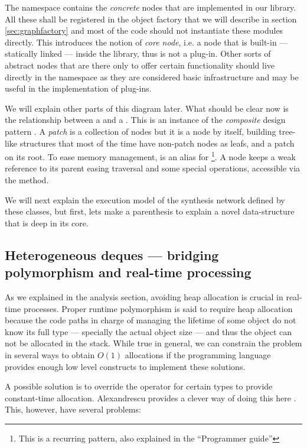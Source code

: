 The  namespace contains the \emph{concrete}
nodes that are implemented in our library. All these shall be
registered in the object factory that we will describe in section
\ref{sec:graphfactory} and most of the code should not instantiate
these modules directly. This introduces the notion of \emph{core
  node}, i.e. a node that is built-in --- statically linked --- inside
the library, thus is not a plug-in. Other sorts of abstract nodes that
are there only to offer certain functionality should live directly in
the  namespace as they are considered basic
infrastructure and may be useful in the implementation of plug-ins.

We will explain other parts of this diagram later. What should be
clear now is the relationship between a  and a
. This is an instance of the \emph{composite} design
pattern \cite{gamma95design, vlissides98pattern}. A \emph{patch} is a
collection of nodes but it is a node by itself, building tree-like
structures that most of the time have non-patch nodes as leafs, and a
patch on its root. To ease memory management,  is an
alias for \footnote{This is a recurring
  pattern, also explained in the ``Programmer guide''}. A node keeps a
weak reference to its parent easing traversal and some special
operations, accessible via the  method.

We will next explain the execution model of the synthesis network
defined by these classes, but first, lets make a parenthesis to
explain a novel data-structure that is deep in its core.

\subsection{Heterogeneous deques --- bridging polymorphism and
  real-time processing}

As we explained in the analysis section, avoiding heap allocation is
crucial in real-time processes. Proper runtime polymorphism is said to
require heap allocation because the code paths in charge of managing
the lifetime of some object do not know its full type --- specially
the actual object size --- and thus the object can not be allocated in
the stack. While true in general, we can constrain the problem in
several ways to obtain $O (1)$ allocations if the programming language
provides enough low level constructs to implement these solutions.

A possible solution is to override the operator  for certain
types to provide constant-time allocation. Alexandrescu provides a
clever way of doing this here \cite{alexandrescu01modern}. This,
however, have several problems:

